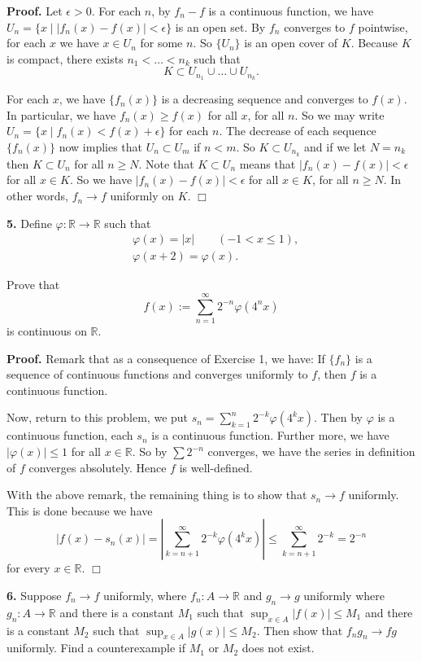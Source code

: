 \documentclass{article}
\begin{document}
\textbf{Proof.} Let $\epsilon > 0$. For each $n$, by $f_n - f$ is a
continuous function, we have $U_n = \{x\mid |f_n(x) - f(x)| <\epsilon\}$
is an open set. By $f_n$ converges to $f$ pointwise, for each $x$ we
have $x\in U_n$ for some $n$. So $\{U_n\}$ is an open cover of $K$.
Because $K$ is compact, there exists $n_1 < \ldots < n_k$ such that
\[K \subset U_{n_1} \cup \ldots \cup U_{n_k}.\]

For each $x$, we have $\{f_n(x)\}$ is a decreasing sequence and
converges to $f(x)$. In particular, we have $f_n(x) \ge f(x)$ for all
$x$, for all $n$. So we may write
$U_n = \{x\mid f_n(x) < f(x) + \epsilon\}$ for each $n$. The decrease of
each sequence $\{f_n(x)\}$ now implies that $U_n \subset U_m$ if
$n < m$. So $K \subset U_{n_k}$ and if we let $N = n_k$ then
$K \subset U_{n}$ for all $n\ge N$. Note that $K\subset U_n$ means that
$|f_n(x) - f(x)| < \epsilon$ for all $x\in K$. So we have
$|f_n(x) - f(x)| < \epsilon$ for all $x\in K$, for all $n\ge N$. In
other words, $f_n \to f$ uniformly on $K$. $\Box$

    \textbf{5.} Define $\varphi:\mathbb{R} \to \mathbb{R}$ such that
\[\begin{aligned}
&\varphi(x)= |x| \qquad (-1<x\le 1),\\
&\varphi(x+2) = \varphi(x).
\end{aligned}\]

Prove that \[ f(x) := \sum_{n=1}^{\infty} 2^{-n} \varphi(4^n x) \] is
continuous on $\mathbb{R}$.

\textbf{Proof.} Remark that as a consequence of Exercise 1, we have: If
$\{f_n\}$ is a sequence of continuous functions and converges uniformly
to $f$, then $f$ is a continuous function.

Now, return to this problem, we put
$s_n = \sum_{k=1}^n 2^{-k}\varphi(4^kx)$. Then by $\varphi$ is a
continuous function, each $s_n$ is a continuous function. Further more,
we have $|\varphi(x)| \le 1$ for all $x\in \mathbb{R}$. So by
$\sum 2^{-n}$ converges, we have the series in definition of $f$
converges absolutely. Hence $f$ is well-defined.

With the above remark, the remaining thing is to show that $s_n \to f$
uniformly. This is done because we have \[
|f(x) - s_n(x)| = \left| \sum_{k=n+1}^{\infty}2^{-k}\varphi(4^kx)\right| \le \sum_{k=n+1}^{\infty}2^{-k} = 2^{-n}
\] for every $x \in \mathbb{R}$. $\Box$

    \textbf{6.} Suppose $f_n \to f$ uniformly, where $f_n :A\to \mathbb{R}$
and $g_n \to g$ uniformly where $g_n:A\to \mathbb{R}$ and there is a
constant $M_1$ such that $\sup_{x\in A}|f(x)| \le M_1$ and there is a
constant $M_2$ such that $\sup_{x\in A}|g(x)| \le M_2$. Then show that
$f_ng_n \to fg$ uniformly. Find a counterexample if $M_1$ or $M_2$ does
not exist.
\end{document}
